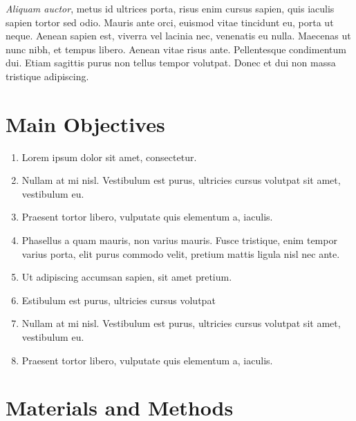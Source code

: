 \documentclass[a0,portrait]{a0poster}
\begin{document}
\begin{multicols}{2}
\textit{Aliquam auctor}, metus id ultrices porta, risus enim cursus sapien, quis iaculis sapien tortor sed odio. Mauris ante orci, euismod vitae tincidunt eu, porta ut neque. Aenean sapien est, viverra vel lacinia nec, venenatis eu nulla. Maecenas ut nunc nibh, et tempus libero. Aenean vitae risus ante. Pellentesque condimentum dui. Etiam sagittis purus non tellus tempor volutpat. Donec et dui non massa tristique adipiscing.


\color{DarkSlateGray} %

\section*{Main Objectives}

\begin{enumerate}
\item Lorem ipsum dolor sit amet, consectetur.
\item Nullam at mi nisl. Vestibulum est purus, ultricies cursus volutpat sit amet, vestibulum eu.
\item Praesent tortor libero, vulputate quis elementum a, iaculis.
\item Phasellus a quam mauris, non varius mauris. Fusce tristique, enim tempor varius porta, elit purus commodo velit, pretium mattis ligula nisl nec ante.
\item Ut adipiscing accumsan sapien, sit amet pretium.
\item Estibulum est purus, ultricies cursus volutpat
\item Nullam at mi nisl. Vestibulum est purus, ultricies cursus volutpat sit amet, vestibulum eu.
\item Praesent tortor libero, vulputate quis elementum a, iaculis.
\end{enumerate}


\section*{Materials and Methods}


\end{multicols}
\end{document}
